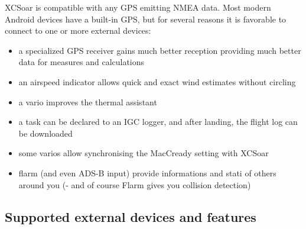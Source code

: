 XCSoar is compatible with any GPS emitting NMEA data.  Most modern
Android devices have a built-in GPS, but for several reasons it is favorable to
connect to one or more external devices:

\begin{itemize}
\item a specialized GPS receiver gains much better reception providing much 
better data for measures and calculations
\item an airspeed indicator allows quick and exact wind estimates
  without circling
\item a vario improves the thermal assistant
\item a task can be declared to an IGC logger, and after landing, the
  flight log can be downloaded
\item some varios allow synchronising the MacCready setting with
  XCSoar
\item flarm (and even ADS-B input) provide informations and stati of others 
around you (- and of course Flarm gives you collision detection)
\end{itemize}

\subsection*{Supported external devices and features}
\label{sec:supported-varios}

\newcommand{\y}[0]{{ $\surd$ }}
\noindent{}

